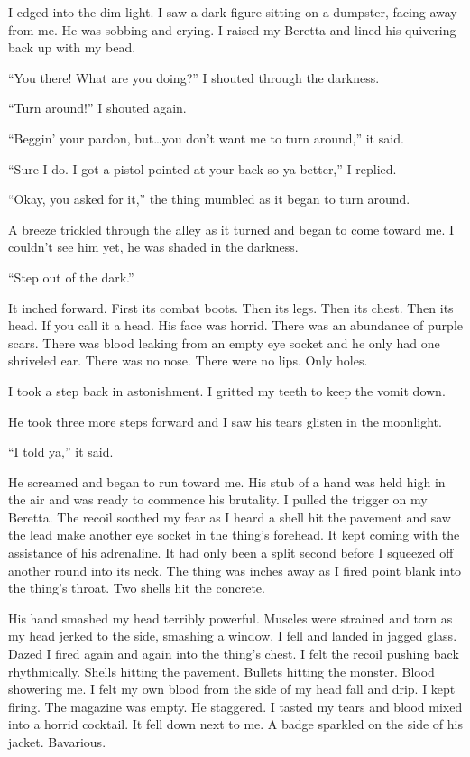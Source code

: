 I edged into the dim light. I saw a dark figure sitting on a dumpster,
facing away from me. He was sobbing and crying. I raised my Beretta and
lined his quivering back up with my bead.

``You there! What are you doing?'' I shouted through the darkness.

``Turn around!'' I shouted again.

``Beggin' your pardon, but\ldots you don't want me to turn around,'' it
said.

``Sure I do. I got a pistol pointed at your back so ya better,'' I
replied.

``Okay, you asked for it,'' the thing mumbled as it began to turn around.

A breeze trickled through the alley as it turned and began to come
toward me. I couldn't see him yet, he was shaded in the darkness.

``Step out of the dark.''

It inched forward. First its combat boots. Then its legs. Then its
chest. Then its head. If you call it a head. His face was horrid. There
was an abundance of purple scars. There was blood leaking from an empty
eye socket and he only had one shriveled ear. There was no nose. There
were no lips. Only holes.

I took a step back in astonishment. I gritted my teeth to keep the vomit
down.

He took three more steps forward and I saw his tears glisten in the
moonlight.

``I told ya,'' it said.

He screamed and began to run toward me. His stub of a hand was held high
in the air and was ready to commence his brutality. I pulled the trigger
on my Beretta. The recoil soothed my fear as I heard a shell hit the
pavement and saw the lead make another eye socket in the thing's
forehead. It kept coming with the assistance of his adrenaline. It had
only been a split second before I squeezed off another round into its
neck. The thing was inches away as I fired point blank into the thing's
throat. Two shells hit the concrete.

His hand smashed my head terribly powerful. Muscles were strained and
torn as my head jerked to the side, smashing a window. I fell and landed
in jagged glass. Dazed I fired again and again into the thing's chest. I
felt the recoil pushing back rhythmically. Shells hitting the
pavement. Bullets hitting the monster. Blood showering me. I felt my own
blood from the side of my head fall and drip. I kept firing. The
magazine was empty. He staggered. I tasted my tears and blood mixed into
a horrid cocktail. It fell down next to me. A badge sparkled on the side
of his jacket. Bavarious.

